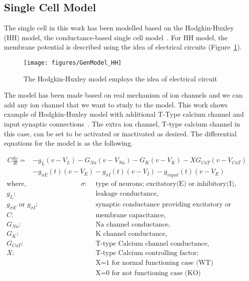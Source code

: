 \subsection{Single Cell Model}

The single cell in this work has been modelled based on the Hodgkin-Huxley (HH) model, the conductance-based single cell model~\cite{hodgkin1952quantitative}. For HH model, the membrane potential is described using the idea of electrical circuits (Figure~\ref{fig:GenModel_HH}). 
\begin{figure}
	\centering
	\texttt{[image: figures/GenModel\_HH]}
	\caption[The Hodgkin-Huxley model]{The Hodgkin-Huxley model employs the idea of electrical circuit}
	\label{fig:GenModel_HH}	
\end{figure}


The model has been made based on real mechanism of ion channels and we can add any ion channel that we want to study to the model. This work shows example of Hodgkin-Huxley model with additional T-Type calcium channel and input synaptic connections~\cite{hodgkin1952quantitative, paik2009spontaneous, wang1991model}. The extra ion channel, T-type calcium channel in this case, can be set to be activated or inactivated as desired. The differential equations for the model is as the following.

\begin{align*}
C\frac{dv}{dt}=&-g_L(v - V_L) - G_{Na}(v - V_{Na}) - G_K(v - V_K) - XG_{CaT}(v - V_{CaT}) \\
&- g_{\sigma E}(t)(v - V_E) - g_{\sigma I}(t)(v - V_I) - g_{input}(t)(v - V_E)
\end{align*}
\begin{align*}
	\text{where,} \hspace{8em} \sigma :& \text{ type of neurons; excitatory(E) or inhibitory(I),} \\
	g_L :& \text{ leakage conductance,} \\
	g_{\sigma E} \text{ or } g_{\sigma I} :& \text{ synaptic conductance providing excitatory or inhibitory input} \\
	C :& \text{ membrane capacitance,}\\
	G_{Na} :& \text{ Na channel conductance,}\\
	G_{K} :& \text{ K channel conductance,}\\
	G_{CaT} :& \text{ T-type Calcium channel conductance,}\\
	X :& \text{ T-type Calcium controlling factor;}\\
	 & \text{ X=1 for normal functioning case (WT) }\\
	 & \text{ X=0 for not functioning case (KO) }\\
\end{align*}

